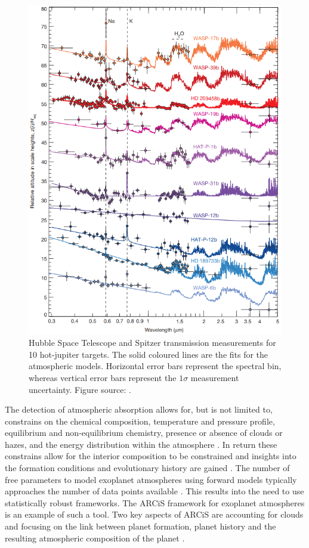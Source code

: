 \begin{figure} [!htb]
    \centering
    \includegraphics[scale=0.7]{figuren/nature_spectra.png}
    \caption{Hubble Space Telescope and Spitzer transmission measurements for 10 hot-jupiter targets. The solid coloured lines are the fits for the atmospheric models. Horizontal error bars represent the spectral bin, whereas vertical error bars represent the $1
    \sigma$ measurement uncertainty. Figure source: \cite{sing2016continuum}.}
    \label{fig:nature_spectra}
\end{figure}

The detection of atmospheric absorption allows for, but is not limited to, constrains on the chemical composition, temperature and pressure profile, equilibrium and non-equilibrium chemistry, presence or absence of clouds or hazes, and the energy distribution within the atmosphere \cite{madhusudhan2014exoplanetary, madhusudhan2018atmospheric, sing2016continuum, waldmann2015tau}. In return these constrains allow for the interior composition to be constrained and insights into the formation conditions and evolutionary history are gained \cite{benneke2012atmospheric}. The number of free parameters to model exoplanet atmospheres using forward models typically approaches the number of data points available \cite{madhusudhan2018atmospheric}. This results into the need to use statistically robust frameworks. The ARCiS framework for exoplanet atmospheres is an example of such a tool. Two key aspects of ARCiS are accounting for clouds and focusing on the link between planet formation, planet history and the resulting atmospheric composition of the planet \cite{min2019arcis}.

